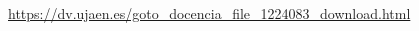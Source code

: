 
\begin{thebibliography}{0}
	
	\url{https://dv.ujaen.es/goto_docencia_file_1224083_download.html}
	
\end{thebibliography}

